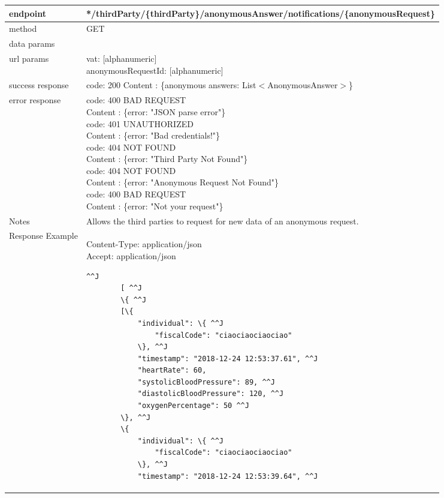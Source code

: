 	\begin{tabularx}{\linewidth}{| l| l }
		\hline
		endpoint & */thirdParty/\{thirdParty\}/anonymousAnswer/notifications/\{anonymousRequest\} \\
		\hline
		method & GET \\
		\hline
		data params & \\
		\hline
		url params &
		\parbox{0.7\textwidth}{
			\bigskip
			vat: [alphanumeric]\\
			anonymousRequestId: [alphanumeric]
			\bigskip
		} \\
		\hline
		success response &
		\parbox{0.7\textwidth}{
			\bigskip
			code: 200\\
			Content : \{anonymous answers: List$<$AnonymousAnswer$>$\}
			\bigskip
		} \\
		\hline
		error response &
		\parbox{0.7\textwidth}{
			\bigskip
			code: 400 BAD REQUEST \\
			Content : \{error: "JSON parse error"\}\\
			code: 401 UNAUTHORIZED \\
			Content : \{error: "Bad credentials!"\}\\
			code: 404 NOT FOUND \\
			Content : \{error: "Third Party Not Found"\}\\
			code: 404 NOT FOUND \\
			Content : \{error: "Anonymous Request Not Found"\}\\
			code: 400 BAD REQUEST \\
			Content : \{error: "Not your request"\}\\
			\bigskip
		} \\
		\hline
		Notes & 
		\parbox{0.7\textwidth}{
			\bigskip Allows the third parties to request for new data of an anonymous request.
		\bigskip}  \\
		\hline
		Response Example & 
		\parbox{0.8\textwidth}{
		\bigskip
		Content-Type: application/json \\
		Accept: application/json \\
		\bigskip
		\begin{lstlisting}^^J
		[ ^^J
		\{ ^^J
		[\{
			"individual": \{ ^^J
				"fiscalCode": "ciaociaociaociao"
			\}, ^^J
			"timestamp": "2018-12-24 12:53:37.61", ^^J
			"heartRate": 60,
			"systolicBloodPressure": 89, ^^J
			"diastolicBloodPressure": 120, ^^J
			"oxygenPercentage": 50 ^^J
		\}, ^^J
		\{
			"individual": \{ ^^J
				"fiscalCode": "ciaociaociaociao"
			\}, ^^J
			"timestamp": "2018-12-24 12:53:39.64", ^^J

\end{lstlisting}}
\end{tabularx}
